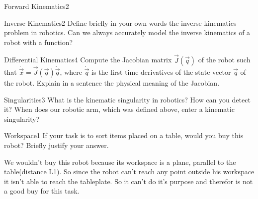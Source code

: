 \begin{questions}
\begin{question}{Forward Kinematics}{2}
\begin{answer}
\end{answer}
\end{question}


\begin{question}{Inverse Kinematics}{2}
Define briefly in your own words the inverse kinematics problem in robotics.  
Can we always accurately model the inverse kinematics of a robot with a
function?

\begin{answer}\end{answer}

\end{question}


\begin{question}{Differential Kinematics}{4}
Compute the Jacobian matrix $\vec{J}(\vec{q})$ of the robot such that $\dot{\vec{x}}=\vec{J}(\vec{q})\dot{\vec{q}}$, where $\dot{\vec{q}}$ is the first time derivatives of the state vector $\vec{q}$ of the robot. Explain in a sentence the physical meaning of the Jacobian. 

\begin{answer}


\end{answer}

\end{question}


\begin{question}{Singularities}{3}
What is the kinematic singularity in robotics? How can you detect it? When does our robotic arm, which was defined above, enter a kinematic singularity?

\begin{answer}\end{answer}

\end{question}


\begin{question}{Workspace}{1}
If your task is to sort items placed on a table, would you buy this robot? Briefly justify your answer.

\begin{answer}
We wouldn't buy this robot because its workspace is a plane, parallel to the table(distance L1). So since the robot can't reach any point outside his workspace it isn't able to reach the tableplate. So it can't do it's purpose and therefor is not a good buy for this task.
\end{answer}

\end{question}

\end{questions}
